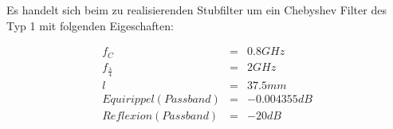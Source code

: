 Es handelt sich beim zu realisierenden Stubfilter um ein Chebyshev Filter des Typ 1 mit folgenden Eigeschaften: 
\begin{mdframed}
\begin{equation*} 
\begin{array}{cllll} 
f_C & = & 0.8 GHz \\ 
f_\frac{\lambda}{4} & = & 2 GHz \\ 
l & = & 37.5mm \\
Equirippel (Passband) & = & -0.004355 dB \\
Reflexion (Passband) & = & -20 dB \\
\end{array} 
\end{equation*} 
\end{mdframed}



